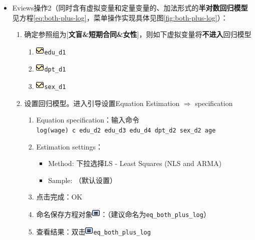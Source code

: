 \documentclass[12pt,(landscape,a4paper),(portrait,a4paper)]{article}
\providecommand{\tightlist}{%
  \setlength{\itemsep}{0pt}\setlength{\parskip}{0pt}}
\theoremstyle{definition}
\theoremstyle{definition}
\theoremstyle{definition}
\theoremstyle{remark}
\begin{document}
\begin{itemize}
\tightlist
\item
  Eviews操作2（同时含有虚拟变量和定量变量的、加法形式的\textbf{半对数回归模型}见方程\eqref{eq:both-plus-log}，菜单操作实现具体见图\ref{fig:both-plus-log}）：

  \begin{enumerate}
  \def\labelenumi{\arabic{enumi})}
  \tightlist
  \item
    确定参照组为{[}\textbf{文盲\&短期合同\&女性}{]}，则如下虚拟变量将\textbf{不进入}回归模型

    \begin{enumerate}
    \def\labelenumii{\alph{enumii}.}
    \tightlist
    \item
      \includegraphics{picture/object/Series.png}\texttt{edu\_d1}
    \item
      \includegraphics{picture/object/Series.png}\texttt{dpt\_d1}
    \item
      \includegraphics{picture/object/Series.png}\texttt{sex\_d1}
    \end{enumerate}
  \item
    设置回归模型。进入引导设置Equation Estimation \(\Rightarrow\)
    specification

    \begin{enumerate}
    \def\labelenumii{\alph{enumii}.}
    \tightlist
    \item
      Equation
      specification：输入命令\texttt{log(wage)\ c\ edu\_d2\ edu\_d3\ edu\_d4\ dpt\_d2\ sex\_d2\ age}
    \item
      Estimation settings：

      \begin{itemize}
      \tightlist
      \item
        Method: 下拉选择LS - Least Squares (NLS and ARMA)
      \item
        Sample: （默认设置）
      \end{itemize}
    \item
      点击完成：OK
    \item
      命名保存方程对象\includegraphics{picture/object/Equation.png}：（建议命名为\texttt{eq\_both\_plus\_log}）
    \item
      查看结果：双击\includegraphics{picture/object/Equation.png}\texttt{eq\_both\_plus\_log}
    \end{enumerate}
  \end{enumerate}
\end{itemize}
\end{document}
